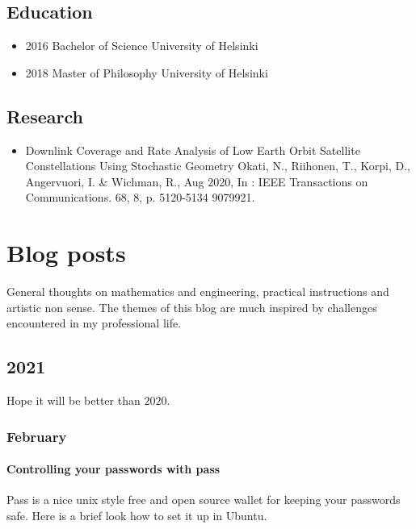 \documentclass{article}
\begin{document}
\section{Education}
\begin{itemize}
\item 2016 Bachelor of Science University of Helsinki\\
\item 2018 Master of Philosophy University of Helsinki
\end{itemize}
\section{Research}

\begin{itemize}
\item Downlink Coverage and Rate Analysis of Low Earth Orbit Satellite Constellations Using Stochastic Geometry
Okati, N., Riihonen, T., Korpi, D., Angervuori, I. & Wichman, R., Aug 2020, In : IEEE Transactions on Communications. 68, 8, p. 5120-5134 9079921.\\
\end{itemize}


\chapter{Blog posts}
General thoughts on mathematics and engineering, practical instructions and artistic non sense. The themes of this blog are much inspired by challenges encountered in my professional life.

\section{2021}
Hope it will be better than $2020.$
\subsection{February}
\subsubsection{Controlling your passwords with pass}
Pass is a nice unix style free and open source wallet for keeping your passwords safe. Here is a brief look how to set it up in Ubuntu.
\end{document}
